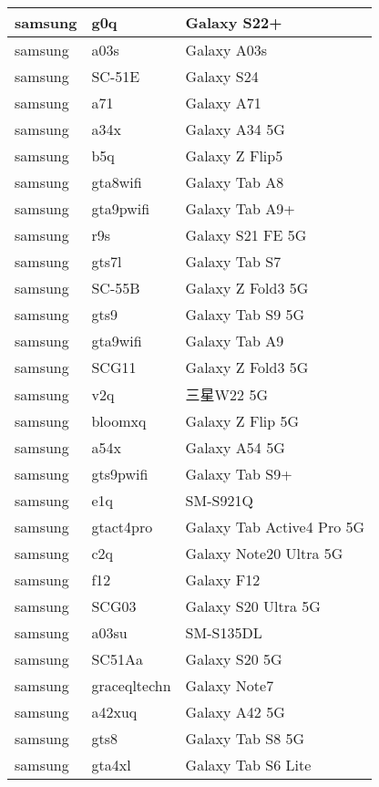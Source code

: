 \begin{tabularx}{\linewidth}{|l|X|X|}
        samsung & g0q & Galaxy S22+ \\ \hline
        samsung & a03s & Galaxy A03s \\ \hline
        samsung & SC-51E & Galaxy S24 \\ \hline
        samsung & a71 & Galaxy A71 \\ \hline
        samsung & a34x & Galaxy A34 5G \\ \hline
        samsung & b5q & Galaxy Z Flip5 \\ \hline
        samsung & gta8wifi & Galaxy Tab A8 \\ \hline
        samsung & gta9pwifi & Galaxy Tab A9+ \\ \hline
        samsung & r9s & Galaxy S21 FE 5G \\ \hline
        samsung & gts7l & Galaxy Tab S7 \\ \hline
        samsung & SC-55B & Galaxy Z Fold3 5G \\ \hline
        samsung & gts9 & Galaxy Tab S9 5G \\ \hline
        samsung & gta9wifi & Galaxy Tab A9 \\ \hline
        samsung & SCG11 & Galaxy Z Fold3 5G \\ \hline
        samsung & v2q & 三星W22 5G \\ \hline
        samsung & bloomxq & Galaxy Z Flip 5G \\ \hline
        samsung & a54x & Galaxy A54 5G \\ \hline
        samsung & gts9pwifi & Galaxy Tab S9+ \\ \hline
        samsung & e1q & SM-S921Q \\ \hline
        samsung & gtact4pro & Galaxy Tab Active4 Pro 5G \\ \hline
        samsung & c2q & Galaxy Note20 Ultra 5G \\ \hline
        samsung & f12 & Galaxy F12 \\ \hline
        samsung & SCG03 & Galaxy S20 Ultra 5G \\ \hline
        samsung & a03su & SM-S135DL \\ \hline
        samsung & SC51Aa & Galaxy S20 5G \\ \hline
        samsung & graceqltechn & Galaxy Note7 \\ \hline
        samsung & a42xuq & Galaxy A42 5G \\ \hline
        samsung & gts8 & Galaxy Tab S8 5G \\ \hline
        samsung & gta4xl & Galaxy Tab S6 Lite \\ \hline

\end{tabularx}
